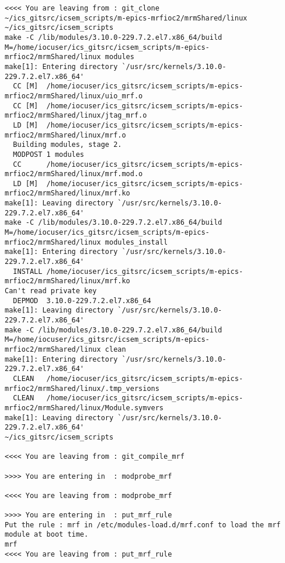 \documentclass[11pt
  , a4paper
  , article
  , oneside
  , showtrims
]{memoir}
\begin{document}
\begin{itemize}
\begin{lstlisting}[style=termstyle]
<<<< You are leaving from : git_clone
~/ics_gitsrc/icsem_scripts/m-epics-mrfioc2/mrmShared/linux ~/ics_gitsrc/icsem_scripts
make -C /lib/modules/3.10.0-229.7.2.el7.x86_64/build M=/home/iocuser/ics_gitsrc/icsem_scripts/m-epics-mrfioc2/mrmShared/linux modules
make[1]: Entering directory `/usr/src/kernels/3.10.0-229.7.2.el7.x86_64'
  CC [M]  /home/iocuser/ics_gitsrc/icsem_scripts/m-epics-mrfioc2/mrmShared/linux/uio_mrf.o
  CC [M]  /home/iocuser/ics_gitsrc/icsem_scripts/m-epics-mrfioc2/mrmShared/linux/jtag_mrf.o
  LD [M]  /home/iocuser/ics_gitsrc/icsem_scripts/m-epics-mrfioc2/mrmShared/linux/mrf.o
  Building modules, stage 2.
  MODPOST 1 modules
  CC      /home/iocuser/ics_gitsrc/icsem_scripts/m-epics-mrfioc2/mrmShared/linux/mrf.mod.o
  LD [M]  /home/iocuser/ics_gitsrc/icsem_scripts/m-epics-mrfioc2/mrmShared/linux/mrf.ko
make[1]: Leaving directory `/usr/src/kernels/3.10.0-229.7.2.el7.x86_64'
make -C /lib/modules/3.10.0-229.7.2.el7.x86_64/build M=/home/iocuser/ics_gitsrc/icsem_scripts/m-epics-mrfioc2/mrmShared/linux modules_install
make[1]: Entering directory `/usr/src/kernels/3.10.0-229.7.2.el7.x86_64'
  INSTALL /home/iocuser/ics_gitsrc/icsem_scripts/m-epics-mrfioc2/mrmShared/linux/mrf.ko
Can't read private key
  DEPMOD  3.10.0-229.7.2.el7.x86_64
make[1]: Leaving directory `/usr/src/kernels/3.10.0-229.7.2.el7.x86_64'
make -C /lib/modules/3.10.0-229.7.2.el7.x86_64/build M=/home/iocuser/ics_gitsrc/icsem_scripts/m-epics-mrfioc2/mrmShared/linux clean
make[1]: Entering directory `/usr/src/kernels/3.10.0-229.7.2.el7.x86_64'
  CLEAN   /home/iocuser/ics_gitsrc/icsem_scripts/m-epics-mrfioc2/mrmShared/linux/.tmp_versions
  CLEAN   /home/iocuser/ics_gitsrc/icsem_scripts/m-epics-mrfioc2/mrmShared/linux/Module.symvers
make[1]: Leaving directory `/usr/src/kernels/3.10.0-229.7.2.el7.x86_64'
~/ics_gitsrc/icsem_scripts

<<<< You are leaving from : git_compile_mrf

>>>> You are entering in  : modprobe_mrf

<<<< You are leaving from : modprobe_mrf

>>>> You are entering in  : put_mrf_rule
Put the rule : mrf in /etc/modules-load.d/mrf.conf to load the mrf module at boot time.
mrf
<<<< You are leaving from : put_mrf_rule


\end{lstlisting}
\end{itemize}
\end{document}
